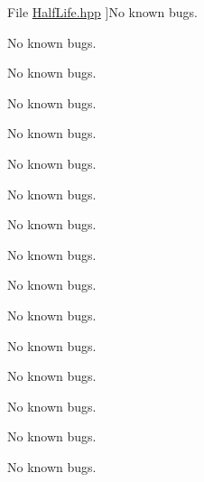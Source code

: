 \begin{DoxyRefList}
%
File \hyperlink{_half_life_8hpp}{Half\+Life.hpp} ]No known bugs.  
\item[\label{bug__bug000024}%
\Hypertarget{bug__bug000024}%
File \hyperlink{_half_life_8inl}{Half\+Life.inl} ]No known bugs.  
\item[\label{bug__bug000031}%
\Hypertarget{bug__bug000031}%
File \hyperlink{_kinematics_8hpp}{Kinematics.hpp} ]No known bugs.  
\item[\label{bug__bug000032}%
\Hypertarget{bug__bug000032}%
File \hyperlink{_kinematics_constants_8hpp}{Kinematics\+Constants.hpp} ]No known bugs.  
\item[\label{bug__bug000041}%
\Hypertarget{bug__bug000041}%
File \hyperlink{_lorentz_transformations_8hpp}{Lorentz\+Transformations.hpp} ]No known bugs.  
\item[\label{bug__bug000042}%
\Hypertarget{bug__bug000042}%
File \hyperlink{_lorentz_transformations_8inl}{Lorentz\+Transformations.inl} ]No known bugs.  
\item[\label{bug__bug000011}%
\Hypertarget{bug__bug000011}%
File \hyperlink{_luminosity_8hpp}{Luminosity.hpp} ]No known bugs.  
\item[\label{bug__bug000012}%
\Hypertarget{bug__bug000012}%
File \hyperlink{_luminosity_8inl}{Luminosity.inl} ]No known bugs.  
\item[\label{bug__bug000025}%
\Hypertarget{bug__bug000025}%
File \hyperlink{_mean_lifetime_8hpp}{Mean\+Lifetime.hpp} ]No known bugs.  
\item[\label{bug__bug000033}%
\Hypertarget{bug__bug000033}%
File \hyperlink{_optics_8hpp}{Optics.hpp} ]No known bugs.  
\item[\label{bug__bug000034}%
\Hypertarget{bug__bug000034}%
File \hyperlink{_optics_constants_8hpp}{Optics\+Constants.hpp} ]No known bugs.  
\item[\label{bug__bug000013}%
\Hypertarget{bug__bug000013}%
File \hyperlink{_orbital_charecteristics_8hpp}{Orbital\+Charecteristics.hpp} ]No known bugs.  
\item[\label{bug__bug000014}%
\Hypertarget{bug__bug000014}%
File \hyperlink{_orbital_charecteristics_8inl}{Orbital\+Charecteristics.inl} ]No known bugs.  
\item[\label{bug__bug000009}%
\Hypertarget{bug__bug000009}%
File \hyperlink{_periapsis_8hpp}{Periapsis.hpp} ]No known bugs. 

No known bugs.  
\item[\label{bug__bug000010}%
\Hypertarget{bug__bug000010}%
File \hyperlink{_periapsis_8inl}{Periapsis.inl} ]No known bugs. 


\end{DoxyRefList}
